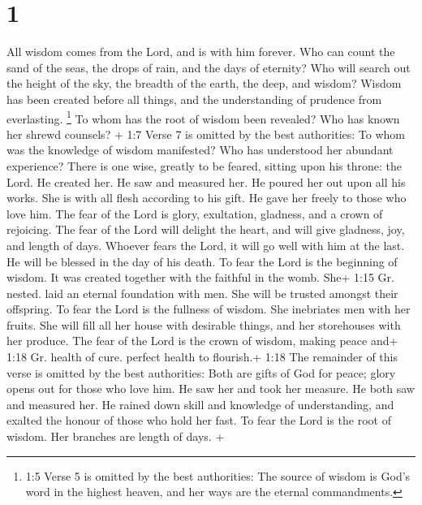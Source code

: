 \hypertarget{section}{%
\section{1}\label{section}}

 All wisdom comes from the Lord, and is with him forever.
 Who can count the sand of the seas, the drops of rain, and
the days of eternity?  Who will search out the height of the
sky, the breadth of the earth, the deep, and wisdom?  Wisdom
has been created before all things, and the understanding of prudence
from everlasting.  \footnote{1:5 Verse 5 is omitted by the
  best authorities: The source of wisdom is God's word in the highest
  heaven, and her ways are the eternal commandments.}  To
whom has the root of wisdom been revealed? Who has known her shrewd
counsels?  + 1:7 Verse 7 is omitted by the best authorities:
To whom was the knowledge of wisdom manifested? Who has understood her
abundant experience?  There is one wise, greatly to be
feared, sitting upon his throne: the Lord.  He created her.
He saw and measured her. He poured her out upon all his works.
 She is with all flesh according to his gift. He gave her
freely to those who love him.  The fear of the Lord is
glory, exultation, gladness, and a crown of rejoicing.  The
fear of the Lord will delight the heart, and will give gladness, joy,
and length of days.  Whoever fears the Lord, it will go
well with him at the last. He will be blessed in the day of his death.
 To fear the Lord is the beginning of wisdom. It was
created together with the faithful in the womb.  She+ 1:15
Gr. nested. laid an eternal foundation with men. She will be trusted
amongst their offspring.  To fear the Lord is the fullness
of wisdom. She inebriates men with her fruits.  She will
fill all her house with desirable things, and her storehouses with her
produce.  The fear of the Lord is the crown of wisdom,
making peace and+ 1:18 Gr. health of cure. perfect health to flourish.+
1:18 The remainder of this verse is omitted by the best authorities:
Both are gifts of God for peace; glory opens out for those who love him.
He saw her and took her measure.  He both saw and measured
her. He rained down skill and knowledge of understanding, and exalted
the honour of those who hold her fast.  To fear the Lord is
the root of wisdom. Her branches are length of days.  +
